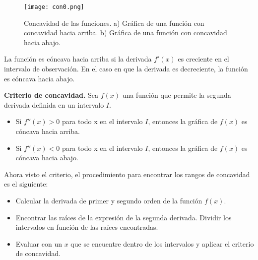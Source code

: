  \begin{center}
\begin{figure}[h!]
\centering
\texttt{[image: con0.png]}
\caption[Concavidad de las funciones.]{Concavidad de las funciones. a) Gráfica de una función con concavidad hacia arriba. b) Gráfica de una función con concavidad hacia abajo.} \label{con0}
\end{figure}
\end{center}

La función es cóncava hacia arriba si la derivada $f'(x)$ es creciente en el intervalo de observación. En el caso en que la derivada es decreciente, la función es cóncava hacia abajo.\\ 

\begin{mydef}
\textbf{Criterio de concavidad. } Sea $f(x)$ una función que permite la segunda derivada definida en un intervalo $I$.
\begin{itemize}
	\item Si $f''(x)>0$ para todo x en el intervalo $I$, entonces la gráfica de $f(x)$ es cóncava hacia arriba.
	\item Si $f''(x)<0$ para todo x en el intervalo $I$, entonces la gráfica de $f(x)$ es cóncava hacia abajo.
\end{itemize}
\end{mydef}

Ahora visto el criterio, el procedimiento para encontrar los rangos de concavidad es el siguiente: 
\begin{itemize}
	\item Calcular la derivada de primer y segundo orden de la función $f(x)$.
	\item Encontrar las raíces de la expresión de la segunda derivada. Dividir los intervalos en función de las raíces encontradas.
	\item Evaluar con un $x$ que se encuentre dentro de los intervalos y aplicar el criterio de concavidad.
\end{itemize}

